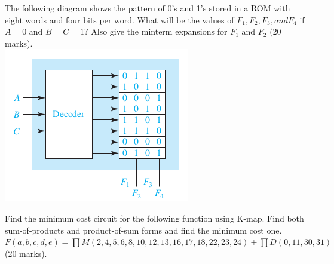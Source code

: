 \begin{prob}
  The following diagram shows the pattern of 0’s and 1’s stored in a ROM
  with eight words and four bits per word. What will be the values of $F_1 , F_2 ,
  F_3 , and F_4$ if $A=0$ and $B = C = 1$?
  Also give the minterm expansions for $F_1$ and $F_2$ (20 marks).\\
  \includegraphics[width=0.4\linewidth]{./media/ROM-minterms.png}
\end{prob}
\newpage

\begin{prob}
  Find the minimum cost circuit for the following function using K-map. Find both
  sum-of-products and product-of-sum forms and find the minimum cost one.\\
  $ F(a, b, c, d, e) = \prod M(2, 4, 5, 6, 8, 10, 12, 13, 16, 17, 18, 22, 23, 24)
   + \prod
  D(0, 11, 30, 31)$ (20 marks).
\end{prob}
\newpage
